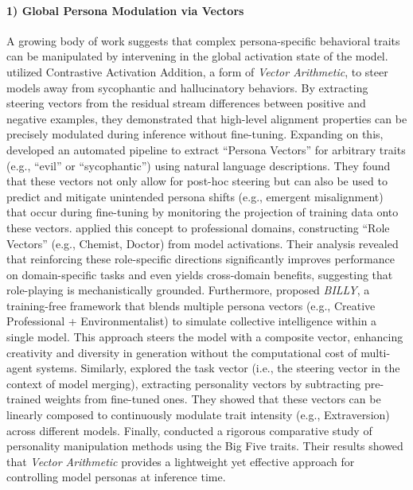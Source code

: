 \documentclass[11pt,letterpaper]{mystyle}
\begin{document}
  \paragraph{1) Global Persona Modulation via Vectors}
  A growing body of work suggests that complex persona-specific behavioral traits can be manipulated by intervening in the global activation state of the model.
  \citet{rimsky-etal-2024-steering} utilized Contrastive Activation Addition, a form of \textit{Vector Arithmetic}, to steer models away from sycophantic and hallucinatory behaviors. By extracting steering vectors from the residual stream differences between positive and negative examples, they demonstrated that high-level alignment properties can be precisely modulated during inference without fine-tuning.
  Expanding on this, \citet{chen2025persona} developed an automated pipeline to extract ``Persona Vectors'' for arbitrary traits (e.g., ``evil'' or ``sycophantic'') using natural language descriptions. They found that these vectors not only allow for post-hoc steering but can also be used to predict and mitigate unintended persona shifts (e.g., emergent misalignment) that occur during fine-tuning by monitoring the projection of training data onto these vectors.
  \citet{poterti-etal-2025-role} applied this concept to professional domains, constructing ``Role Vectors'' (e.g., Chemist, Doctor) from model activations. Their analysis revealed that reinforcing these role-specific directions significantly improves performance on domain-specific tasks and even yields cross-domain benefits, suggesting that role-playing is mechanistically grounded.
  Furthermore, \citet{pai2025billy} proposed \textit{BILLY}, a training-free framework that blends multiple persona vectors (e.g., Creative Professional + Environmentalist) to simulate collective intelligence within a single model. This approach steers the model with a composite vector, enhancing creativity and diversity in generation without the computational cost of multi-agent systems.
  Similarly, \citet{sun-etal-2025-personality} explored the task vector (i.e., the steering vector in the context of model merging), extracting personality vectors by subtracting pre-trained weights from fine-tuned ones. They showed that these vectors can be linearly composed to continuously modulate trait intensity (e.g., Extraversion) across different models.
  Finally, \citet{handa2025personality} conducted a rigorous comparative study of personality manipulation methods using the Big Five traits. 
  Their results showed that \textit{Vector Arithmetic} provides a lightweight yet effective approach for controlling model personas at inference time.
  
\end{document}
